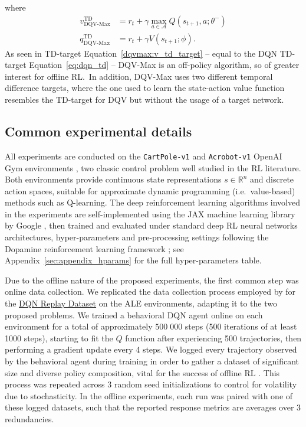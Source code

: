 where
\begin{align}
  v^{\scriptscriptstyle \textrm{TD}}_{\scriptscriptstyle
  \textrm{DQV-Max}}&=r_t+\gamma\max_{a\in\mathcal{A}}Q\left(s_{t+1},a;\theta^{-}\right)
  \label{dqvmax:v_td_target}\\
  q^{\scriptscriptstyle \textrm{TD}}_{\scriptscriptstyle \textrm{DQV-Max}}&=r_t+\gamma
  V\left(s_{t+1};\phi\right)\label{dqvmax:q_td_target}.
\end{align} As seen in TD-target
Equation~\ref{dqvmax:v_td_target} -- equal to the DQN TD-target
Equation~\ref{eq:dqn_td} -- DQV-Max is an off-policy algorithm, so
of greater interest for offline RL.\ In addition,
DQV-Max uses two different temporal difference targets, where the one
used to learn the state-action value function resembles the TD-target
for DQV but without the usage of a target network.

\subsection{Common experimental details}
All experiments are conducted on the
\texttt{CartPole-v1} and \texttt{Acrobot-v1} OpenAI Gym environments
\citep{https://doi.org/10.48550/arxiv.1606.01540}, two classic control
problem well studied in the RL literature. Both environments
provide continuous state representations $s\in \mathbb{R}^n$ and
discrete action spaces, suitable for approximate dynamic programming
(i.e.\ value-based) methods such as Q-learning. The
deep reinforcement learning algorithms involved in the experiments are
self-implemented using the JAX machine learning library by Google
\citep{jax2018github}, then trained and evaluated under standard deep
RL neural networks architectures, hyper-parameters and pre-processing
settings following the Dopamine reinforcement
learning framework \citep{castro18dopamine}; see
Appendix~\ref{sec:appendix_hparams} for the full hyper-parameters
table.

Due to the offline nature of the proposed experiments,
the first common step was online data collection. We replicated the
data collection process employed by \citet{agarwal2020optimistic} for
the \href{https://research.google/tools/datasets/dqn-replay/}{DQN
  Replay Dataset} on the ALE environments, adapting it to the two
proposed problems. We
trained a behavioral DQN agent online on each environment for a total
of approximately $500 \; 000$ steps (500 iterations of at least 1000
steps),
starting to fit the $Q$ function after experiencing 500
trajectories, then performing a gradient update every 4 steps. We
logged every trajectory observed by the behavioral agent during
training in order to gather a dataset of significant size and diverse
policy composition, vital for the success of offline RL
\citep{agarwal2020optimistic}. This process was repeated across 3
random seed initializations to control for volatility due to
stochasticity. In the offline experiments, each run was
paired with one of these logged datasets, such that the reported
response metrics are averages over 3 redundancies.

